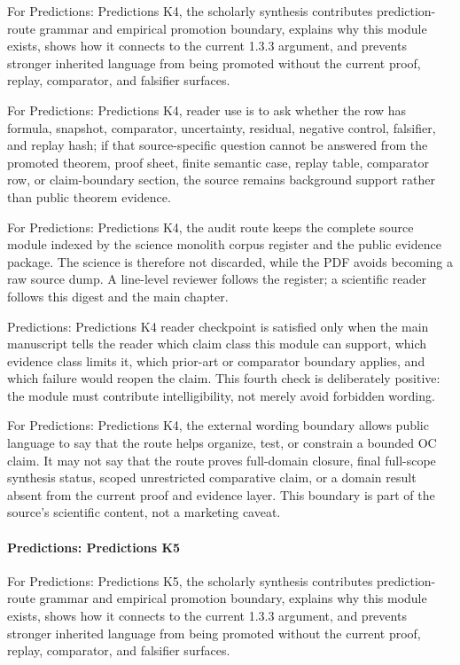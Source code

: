 For Predictions: Predictions K4, the scholarly synthesis contributes prediction-route grammar and empirical promotion boundary, explains why this module exists, shows how it connects to the current 1.3.3 argument, and prevents stronger inherited language from being promoted without the current proof, replay, comparator, and falsifier surfaces.


For Predictions: Predictions K4, reader use is to ask whether the row has formula, snapshot, comparator, uncertainty, residual, negative control, falsifier, and replay hash; if that source-specific question cannot be answered from the promoted theorem, proof sheet, finite semantic case, replay table, comparator row, or claim-boundary section, the source remains background support rather than public theorem evidence.


For Predictions: Predictions K4, the audit route keeps the complete source module indexed by the science monolith corpus register and the public evidence package. The science is therefore not discarded, while the PDF avoids becoming a raw source dump. A line-level reviewer follows the register; a scientific reader follows this digest and the main chapter.


Predictions: Predictions K4 reader checkpoint is satisfied only when the main manuscript tells the reader which claim class this module can support, which evidence class limits it, which prior-art or comparator boundary applies, and which failure would reopen the claim. This fourth check is deliberately positive: the module must contribute intelligibility, not merely avoid forbidden wording.


For Predictions: Predictions K4, the external wording boundary allows public language to say that the route helps organize, test, or constrain a bounded OC claim. It may not say that the route proves full-domain closure, final full-scope synthesis status, scoped unrestricted comparative claim, or a domain result absent from the current proof and evidence layer. This boundary is part of the source's scientific content, not a marketing caveat.


\paragraph{Predictions: Predictions K5}

For Predictions: Predictions K5, the scholarly synthesis contributes prediction-route grammar and empirical promotion boundary, explains why this module exists, shows how it connects to the current 1.3.3 argument, and prevents stronger inherited language from being promoted without the current proof, replay, comparator, and falsifier surfaces.


